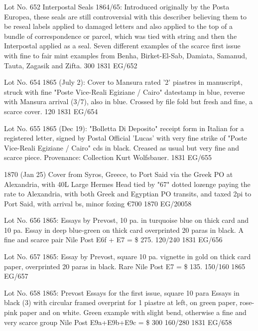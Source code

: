 \documentclass[justified]{tufte-book}
\begin{document}
%
{Lot No. 652
Interpostal Seals 1864/65: Introduced originally by the Posta Europea, these seals are still controversial with this describer believing them to be reseal labels applied to damaged letters and also applied to the top of a bundle of correspondence or parcel, which was tied with string and then the Interpostal applied as a seal. Seven different examples of the scarce first issue with fine to fair mint examples from Benha, Birket-El-Sab, Damiata, Samanud, Tauta, Zagasik and Zifta. 300
 }%
{1831}%
{EG/652}%
{}%
{}
{}%
{}

%
{Lot No. 654
1865 (July 2): Cover to Mansura rated '2' piastres in manuscript, struck with fine "Poste Vice-Reali Egiziane / Cairo" datestamp in blue, reverse with Mansura arrival (3/7), also in blue. Crossed by file fold but fresh and fine, a scarce cover. 120
 }%
{1831}%
{EG/654}%
{}%
{}
{}%
{}


%
{Lot No. 655
1865 (Dec 19): "Bolletta Di Deposito" receipt form in Italian for a registered letter, signed by Postal Official 'Lucas' with very fine strike of "Poste Vice-Reali Egiziane / Cairo" cds in black. Creased as usual but very fine and scarce piece. Provenance: Collection Kurt Wolfsbauer.
 }%
{1831}%
{EG/655}%
{}%
{}
{}%
{}

%
{1870 (Jan 25) Cover from Syros, Greece, to Port Said via the Greek PO at Alexandria, with 40L Large Hermes Head tied by "67" dotted lozenge paying the rate to Alexandria, with both Greek and Egyptian PO transits, and taxed 2pi to Port Said, with arrival bs, minor foxing
\euro 700 
 }%
{1870}%
{EG/20058}%
{}%
{}
{}%
{}


%
{Lot No. 656
1865: Essays by Prevost, 10 pa. in turquoise blue on thick card and 10 pa. Essay in deep blue-green on thick card overprinted 20 paras in black. A fine and scarce pair Nile Post E6f + E7 = \$ 275.    120/240
}%
{1831}%
{EG/656}%
{}%
{}
{}%
{}


%
{Lot No. 657
1865: Essay by Prevost, square 10 pa. vignette in gold on thick card paper, overprinted 20 paras in black. Rare Nile Post E7 = \$ 135. 
  150/160 
}%
{1865}%
{EG/657}%
{}%
{}
{}%
{}


%
{Lot No. 658
1865: Prevost Essays for the first issue, square 10 para Essays in black (3) with circular framed overprint for 1 piastre at left, on green paper, rose-pink paper and on white. Green example with slight bend, otherwise a fine and very scarce group Nile Post E9a+E9b+E9c = \$ 300 160/280}%
{1831}%
{EG/658}%
{}%
{}
{}%
{}
\end{document}
